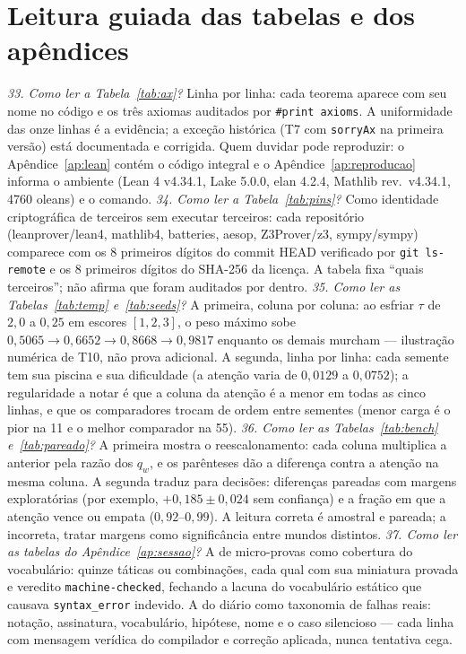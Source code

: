 \section{Leitura guiada das tabelas e dos apêndices}
\textit{33. Como ler a Tabela~\ref{tab:ax}?} Linha por linha: cada teorema aparece com seu nome no código e os três axiomas auditados por \texttt{\#print axioms}. A uniformidade das onze linhas é a evidência; a exceção histórica (T7 com \texttt{sorryAx} na primeira versão) está documentada e corrigida. Quem duvidar pode reproduzir: o Apêndice~\ref{ap:lean} contém o código integral e o Apêndice~\ref{ap:reproducao} informa o ambiente (Lean 4 v4.34.1, Lake 5.0.0, elan 4.2.4, Mathlib rev.\ v4.34.1, 4760 oleans) e o comando.
\textit{34. Como ler a Tabela~\ref{tab:pins}?} Como identidade criptográfica de terceiros sem executar terceiros: cada repositório (leanprover/lean4, mathlib4, batteries, aesop, Z3Prover/z3, sympy/sympy) comparece com os 8 primeiros dígitos do commit HEAD verificado por \texttt{git ls-remote} e os 8 primeiros dígitos do SHA-256 da licença. A tabela fixa ``quais terceiros''; não afirma que foram auditados por dentro.
\textit{35. Como ler as Tabelas~\ref{tab:temp} e~\ref{tab:seeds}?} A primeira, coluna por coluna: ao esfriar $\tau$ de $2{,}0$ a $0{,}25$ em escores $[1,2,3]$, o peso máximo sobe $0{,}5065\to0{,}6652\to0{,}8668\to0{,}9817$ enquanto os demais murcham --- ilustração numérica de T10, não prova adicional. A segunda, linha por linha: cada semente tem sua piscina e sua dificuldade (a atenção varia de $0{,}0129$ a $0{,}0752$); a regularidade a notar é que a coluna da atenção é a menor em todas as cinco linhas, e que os comparadores trocam de ordem entre sementes (menor carga é o pior na 11 e o melhor comparador na 55).
\textit{36. Como ler as Tabelas~\ref{tab:bench} e~\ref{tab:pareado}?} A primeira mostra o reescalonamento: cada coluna multiplica a anterior pela razão dos $q_w$, e os parênteses dão a diferença contra a atenção na mesma coluna. A segunda traduz para decisões: diferenças pareadas com margens exploratórias (por exemplo, $+0{,}185\pm0{,}024$ sem confiança) e a fração em que a atenção vence ou empata ($0{,}92$--$0{,}99$). A leitura correta é amostral e pareada; a incorreta, tratar margens como significância entre mundos distintos.
\textit{37. Como ler as tabelas do Apêndice~\ref{ap:sessao}?} A de micro-provas como cobertura do vocabulário: quinze táticas ou combinações, cada qual com sua miniatura provada e veredito \texttt{machine-checked}, fechando a lacuna do vocabulário estático que causava \texttt{syntax\_error} indevido. A do diário como taxonomia de falhas reais: notação, assinatura, vocabulário, hipótese, nome e o caso silencioso --- cada linha com mensagem verídica do compilador e correção aplicada, nunca tentativa cega.

